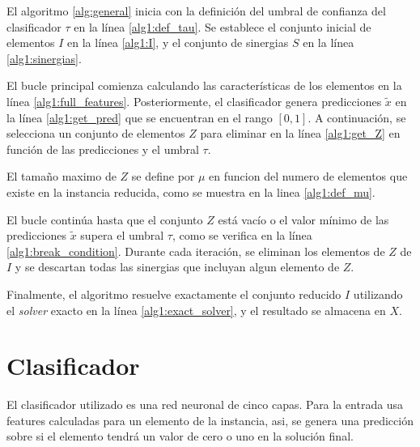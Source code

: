 \documentclass[spanish, a4paper, 12pt, openany,final]{book}
\begin{document}
El algoritmo \ref{alg:general} inicia con la definición del umbral de confianza del clasificador $\tau$ en la línea \ref{alg1:def_tau}. Se establece el conjunto inicial de elementos $I$ en la línea \ref{alg1:I}, y el conjunto de sinergias $S$ en la línea \ref{alg1:sinergias}.

El bucle principal comienza calculando las características de los elementos en la línea \ref{alg1:full_features}. Posteriormente, el clasificador genera predicciones $\tilde{x}$ en la línea \ref{alg1:get_pred} que se encuentran en el rango $[0,1]$. A continuación, se selecciona un conjunto de elementos $Z$ para eliminar en la línea \ref{alg1:get_Z} en función de las predicciones y el umbral $\tau$.

El tamaño maximo de $Z$ se define por $\mu$ en funcion del numero de elementos que existe en la instancia reducida, como se muestra en la linea \ref{alg1:def_mu}.

El bucle continúa hasta que el conjunto $Z$ está vacío o el valor mínimo de las predicciones $\tilde{x}$ supera el umbral $\tau$, como se verifica en la línea \ref{alg1:break_condition}. Durante cada iteración, se eliminan los elementos de $Z$ de $I$ y se descartan todas las sinergias que incluyan algun elemento de $Z$.

Finalmente, el algoritmo resuelve exactamente el conjunto reducido $I$ utilizando el \textit{solver} exacto en la línea \ref{alg1:exact_solver}, y el resultado se almacena en $X$.


\section{Clasificador}

El clasificador utilizado es una red neuronal de cinco capas. Para la entrada usa features calculadas para un elemento de la instancia, asi, se genera una predicción sobre si el elemento tendrá un valor de cero o uno en la solución final.
\end{document}
